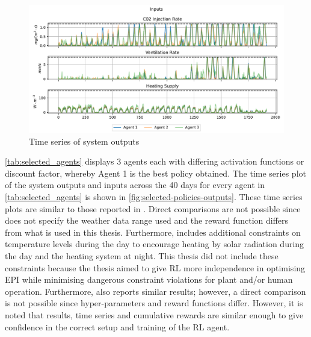 \begin{figure}[H]
    \centering
    \includegraphics[width = \textwidth]{figures/selected_policies_inputs.pdf}
    \caption{Time series of system outputs}
    \label{fig:selected-policies-inputs}
\end{figure}

\autoref{tab:selected_agents} displays 3 agents each with differing activation functions or discount factor, whereby Agent 1 is the best policy obtained. The time series plot of the system outputs and inputs across the 40 days for every agent in \autoref{tab:selected_agents} is shown in \autoref{fig:selected-policies-outputs}. These time series plots are similar to those reported in \citet{jansenOptimalControlLettuce2023,morcegoReinforcementLearningModel2023}. Direct comparisons are not possible since \citet{morcegoReinforcementLearningModel2023} does not specify the weather data range used and the reward function differs from what is used in this thesis. Furthermore, \citet{morcegoReinforcementLearningModel2023} includes additional constraints on temperature levels during the day to encourage heating by solar radiation during the day and the heating system at night. This thesis did not include these constraints because the thesis aimed to give RL more independence in optimising EPI while minimising dangerous constraint violations for plant and/or human operation. Furthermore, \citet{jansenOptimalControlLettuce2023} also reports similar results; however, a direct comparison is not possible since hyper-parameters and reward functions differ. However, it is noted that results, time series and cumulative rewards are similar enough to give confidence in the correct setup and training of the RL agent.

